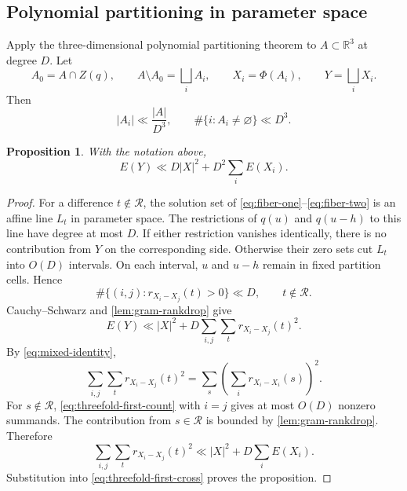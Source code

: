\documentclass[11pt]{amsart}
\numberwithin{equation}{section}
\newtheorem{proposition}[theorem]{Proposition}
\theoremstyle{definition}
\theoremstyle{remark}
\newcommand{\R}{\mathbb R}
\newcommand{\cR}{\mathcal R}
\newcommand{\1}{\mathbf 1}
\newcommand{\card}[1]{\lvert #1\rvert}
\begin{document}
\subsection{Polynomial partitioning in parameter space}
Apply the three-dimensional polynomial partitioning theorem to $A\subset\R^3$ at degree $D$.  Let
\[
 A_0=A\cap Z(q),
 \qquad
 A\setminus A_0=\bigsqcup_i A_i,
 \qquad
 X_i=\Phi(A_i),
 \qquad
 Y=\bigsqcup_iX_i.
\]
Then
\begin{equation}\label{eq:R3-cells}
 \card{A_i}\ll\frac{\card A}{D^3},
 \qquad
 \#\{i:A_i\neq\varnothing\}\ll D^3.
\end{equation}

\begin{proposition}\label{prop:threefold-cell}
With the notation above,
\begin{equation}\label{eq:threefold-cell}
 E(Y)\ll D\card X^2+D^2\sum_iE(X_i).
\end{equation}
\end{proposition}

\begin{proof}
For a difference $t\notin\cR$, the solution set of \eqref{eq:fiber-one}--\eqref{eq:fiber-two} is an affine line $L_t$ in parameter space.  The restrictions of $q(u)$ and $q(u-h)$ to this line have degree at most $D$.  If either restriction vanishes identically, there is no contribution from $Y$ on the corresponding side.  Otherwise their zero sets cut $L_t$ into $O(D)$ intervals.  On each interval, $u$ and $u-h$ remain in fixed partition cells.  Hence
\begin{equation}\label{eq:threefold-first-count}
 \#\{(i,j):r_{X_i-X_j}(t)>0\}\ll D,
 \qquad t\notin\cR.
\end{equation}
Cauchy--Schwarz and \cref{lem:gram-rankdrop} give
\begin{equation}\label{eq:threefold-first-cross}
 E(Y)\ll\card X^2
 +D\sum_{i,j}\sum_t r_{X_i-X_j}(t)^2.
\end{equation}
By \eqref{eq:mixed-identity},
\[
 \sum_{i,j}\sum_t r_{X_i-X_j}(t)^2
 =\sum_s\left(\sum_i r_{X_i-X_i}(s)\right)^2.
\]
For $s\notin\cR$, \eqref{eq:threefold-first-count} with $i=j$ gives at most $O(D)$ nonzero summands.  The contribution from $s\in\cR$ is bounded by \cref{lem:gram-rankdrop}.  Therefore
\begin{equation}\label{eq:threefold-second-cross}
 \sum_{i,j}\sum_t r_{X_i-X_j}(t)^2
 \ll\card X^2+D\sum_iE(X_i).
\end{equation}
Substitution into \eqref{eq:threefold-first-cross} proves the proposition.
\end{proof}
\end{document}
